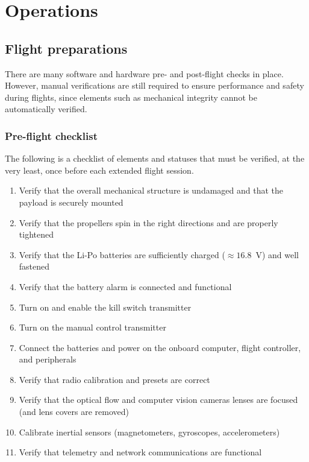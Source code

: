 \section*{Operations} \label{sec:op}

\subsection*{Flight preparations} \label{subsec:op-prep}

There are many software and hardware pre- and post-flight checks in place. However, manual verifications are still required to ensure performance and safety during flights, since elements such as mechanical integrity cannot be automatically verified.

\subsubsection*{Pre-flight checklist}

The following is a checklist of elements and statuses that must be verified, at the very least, once before each extended flight session.

\vspace{-0.75cm}
\begin{enumerate} \itemsep -5pt
	\item Verify that the overall mechanical structure is undamaged and that the payload is securely mounted
	\item Verify that the propellers spin in the right directions and are properly tightened
	\item Verify that the Li-Po batteries are sufficiently charged ($ \approx 16.8 $~V) and well fastened
	\item Verify that the battery alarm is connected and functional
	\item Turn on and enable the kill switch transmitter
	\item Turn on the manual control transmitter
	\item Connect the batteries and power on the onboard computer, flight controller, and peripherals
	\item Verify that radio calibration and presets are correct
	\item Verify that the optical flow and computer vision cameras lenses are focused (and lens covers are removed)
	\item Calibrate inertial sensors (magnetometers, gyroscopes, accelerometers)
	\item Verify that telemetry and network communications are functional
\end{enumerate}


